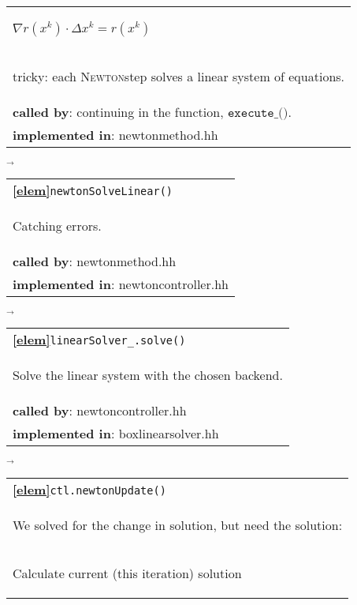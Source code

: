 \begin{landscape}
{\begin{tabular}{|l|}
      \begin{scriptsize}$\nabla r(x^k) \cdot \Delta x^k = r(x^k)$\end{scriptsize}\\
      \begin{scriptsize}tricky: each \textsc{Newton}step solves a linear system of equations. \end{scriptsize}\\
      \textbf{called by}: continuing in the function, $\texttt{execute\_()}$. \\ 
      \textbf{implemented in}: newtonmethod.hh\\ 
	\hline 
  \end{tabular}
\nextline
    {\scriptsize$\overrightarrow{}
    $}
   \begin{tabular}{|l|} 
      \hline 
      \textbf{\textcircled{\ref{elem}}}\verb+newtonSolveLinear()+\\ 
      \begin{scriptsize}Catching errors.\end{scriptsize}\\
      \textbf{called by}: newtonmethod.hh\\ 
      \textbf{implemented in}: newtoncontroller.hh\\ 
	\hline 
  \end{tabular}
    {\scriptsize$\overrightarrow{}
    $}
   \begin{tabular}{|l|} 
      \hline 
      \textbf{\textcircled{\ref{elem}}}\verb+linearSolver_.solve()+\\ 
      \begin{scriptsize}Solve the linear system with the chosen backend.\end{scriptsize}\\
      \textbf{called by}: newtoncontroller.hh\\ 
      \textbf{implemented in}: boxlinearsolver.hh\\ 
	\hline 
  \end{tabular}
\nextline
    {\scriptsize$\overrightarrow{}
    $}
   \begin{tabular}{|l|} 
      \hline 
      \textbf{\textcircled{\ref{elem}}}\verb+ctl.newtonUpdate()+\\ 
      \begin{scriptsize}We solved for  the change in solution, but need the solution:\end{scriptsize}\\
      \begin{scriptsize}Calculate current (this iteration) solution\end{scriptsize}\\

\end{tabular}}
\end{landscape}
